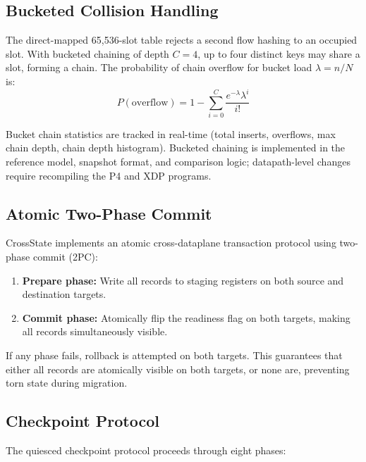 \documentclass[10pt, conference]{IEEEtran}
\begin{document}
\subsection{Bucketed Collision Handling}
\label{subsec:bucketed_chains}
The direct-mapped 65{,}536-slot table rejects a second flow hashing to an occupied slot. With bucketed chaining of depth $C=4$, up to four distinct keys may share a slot, forming a chain. The probability of chain overflow for bucket load $\lambda = n/N$ is:
\begin{equation}
    P(\text{overflow}) = 1 - \sum_{i=0}^{C} \frac{e^{-\lambda}\lambda^i}{i!}
\label{eq:overflow}
\end{equation}

Bucket chain statistics are tracked in real-time (total inserts, overflows, max chain depth, chain depth histogram). Bucketed chaining is implemented in the reference model, snapshot format, and comparison logic; datapath-level changes require recompiling the P4 and XDP programs.

\subsection{Atomic Two-Phase Commit}
\label{subsec:atomic}
CrossState implements an atomic cross-dataplane transaction protocol using two-phase commit (2PC):
\begin{enumerate}
    \item \textbf{Prepare phase:} Write all records to staging registers on both source and destination targets.
    \item \textbf{Commit phase:} Atomically flip the readiness flag on both targets, making all records simultaneously visible.
\end{enumerate}
If any phase fails, rollback is attempted on both targets. This guarantees that either all records are atomically visible on both targets, or none are, preventing torn state during migration.

\subsection{Checkpoint Protocol}
\label{subsec:checkpoint_protocol}
The quiesced checkpoint protocol proceeds through eight phases:
\end{document}
